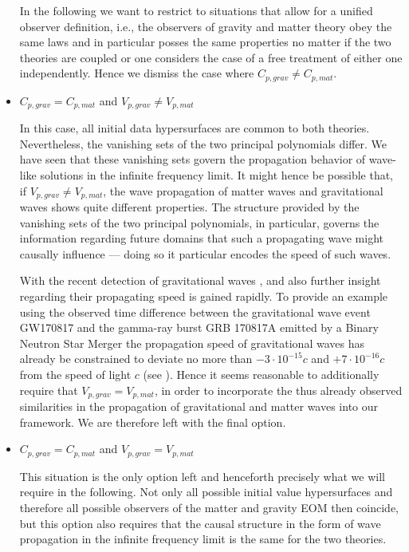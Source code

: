 \begin{itemize}
In the following we want to restrict to situations that allow for a unified observer definition, i.e., the observers of gravity and matter theory obey the same laws and in particular posses the same properties no matter if the two theories are coupled or one considers the case of a free treatment of either one independently. Hence we dismiss the case where $C_{p,grav} \neq C_{p,mat}$.

\item $C_{p,grav} = C_{p,mat}$ and $V_{p,grav} \neq V_{p,mat}$ 

In this case, all initial data hypersurfaces are common to both theories. Nevertheless, the vanishing sets of the two principal polynomials differ. We have seen that these vanishing sets govern the propagation behavior of wave-like solutions in the infinite frequency limit. It might hence be possible that, if $V_{p,grav} \neq V_{p,mat}$, the wave propagation of matter waves and gravitational waves shows quite different properties. The structure provided by the vanishing sets of the two principal polynomials, in particular, governs the information regarding future domains that such a propagating wave might causally influence — doing so it particular encodes the speed of such waves. 

With the recent detection of gravitational waves \cite{2017ApJ...848L..12A}, \cite{2017PhRvL.119n1101A} and \cite{2016PhRvL.116f1102A} also further insight regarding their propagating speed is gained rapidly. 
To provide an example using the observed time difference between the gravitational wave event GW170817 and the gamma-ray burst GRB 170817A emitted by a Binary Neutron Star Merger the propagation speed of gravitational waves has already be constrained to deviate no more than $-3\cdot 10^{{-}15}c$ and $+7\cdot 10^{{-}16}c$ from the speed of light $c$ (see \cite{2017ApJ...848L..13A}). Hence it seems reasonable to additionally require that $V_{p,grav} = V_{p,mat}$, in order to incorporate the thus already observed similarities in the propagation of gravitational and matter waves into our framework. We are therefore left with the final option.
\item $C_{p,grav} = C_{p,mat}$ and $V_{p,grav} = V_{p,mat}$ 

This situation is the only option left and henceforth precisely what we will require in the following. Not only all possible initial value hypersurfaces and therefore all possible observers of the matter and gravity EOM then coincide, but this option also requires that the causal structure in the form of wave propagation in the infinite frequency limit is the same for the two theories.  
\end{itemize}
